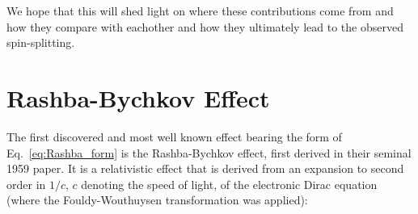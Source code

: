 We hope that this will shed light on where these contributions come from and how they compare with eachother and how they ultimately lead to the observed spin-splitting.

\section{Rashba-Bychkov Effect}
The first discovered and most well known effect bearing the form of Eq.~\ref{eq:Rashba_form} is the Rashba-Bychkov effect, first derived in their seminal 1959 paper\cite{Rashba1959SymmetryAr}. It is a relativistic effect that is derived from an expansion to second order in $1/c$, $c$ denoting the speed of light, of the electronic Dirac equation (where the Fouldy-Wouthuysen transformation was applied):


